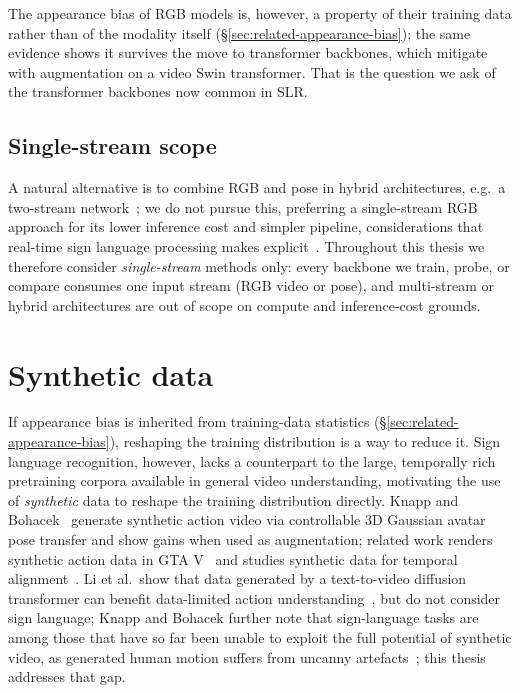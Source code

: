 The appearance bias of RGB models is, however, a property of their
training data rather than of the modality itself
(\S\ref{sec:related-appearance-bias}); the same evidence shows it
survives the move to transformer backbones, which
\citet{liMitigatingEvaluatingStatic2023a} mitigate with augmentation on a
video Swin transformer. That is the question we ask of the transformer
backbones now common in SLR.

\subsection{Single-stream scope}
A natural alternative is
to combine RGB and pose in hybrid architectures, e.g.\ a two-stream
network~\cite{chenTwoStreamNetworkSign}; we do not pursue this, preferring a
single-stream RGB approach for its lower inference cost and simpler
pipeline, considerations that real-time sign language processing makes
explicit~\cite{moryossefRealTimeMultilingualSign2024}. Throughout this thesis we therefore consider \emph{single-stream}
methods only: every backbone we train, probe, or compare consumes one input
stream (RGB video or pose), and multi-stream or hybrid architectures are
out of scope on compute and inference-cost grounds.

\section{Synthetic data}
\label{sec:related-work-synthetic}
If appearance bias is inherited from training-data statistics
(\S\ref{sec:related-appearance-bias}), reshaping the training
distribution is a way to reduce it. Sign language recognition, however, lacks a counterpart
to the large, temporally rich pretraining corpora available in general video
understanding, motivating the use of \emph{synthetic} data to reshape the
training distribution directly. Knapp and Bohacek~\cite{knapp2025synthetic}
generate synthetic action video via controllable 3D Gaussian avatar pose
transfer and show gains when used as augmentation; related work renders
synthetic action data in GTA V~\cite{guoLearningVideoRepresentations2022} and
studies synthetic data for temporal alignment~\cite{SVLTA_Du_2025}. Li et
al.\ show that data generated by a text-to-video diffusion transformer can
benefit data-limited action
understanding~\cite{liRoleVideoGeneration2025}, but do not consider sign
language; Knapp and Bohacek further note that sign-language tasks are among
those that have so far been unable to exploit the full potential of
synthetic video, as generated human motion suffers from uncanny
artefacts~\cite{knapp2025synthetic}; this thesis addresses that gap.

